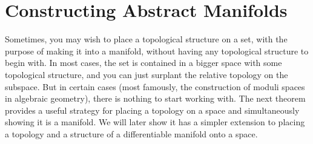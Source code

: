
\section{Constructing Abstract Manifolds}

Sometimes, you may wish to place a topological structure on a set, with the purpose of making it into a manifold, without having any topological structure to begin with. In most cases, the set is contained in a bigger space with some topological structure, and you can just surplant the relative topology on the subspace. But in certain cases (most famously, the construction of moduli spaces in algebraic geometry), there is nothing to start working with. The next theorem provides a useful strategy for placing a topology on a space and simultaneously showing it is a manifold. We will later show it has a simpler extension to placing a topology and a structure of a differentiable manifold onto a space.

